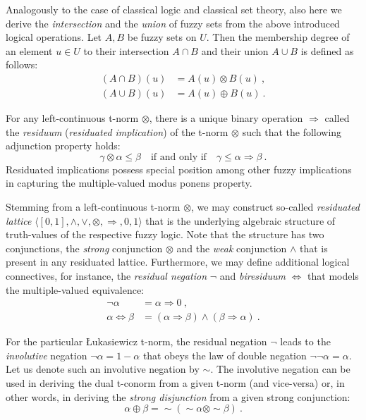 \documentclass[review]{elsarticle}
\begin{document}
Analogously to the case of classical logic and classical set theory, also here we derive the \emph{intersection} and the \emph{union} of fuzzy sets from the above introduced logical operations. Let $A, B$ be fuzzy sets on $U$. Then the membership degree of an element $u\in U$ to their intersection
$A \cap B$ and their union $A\cup B$ is defined as follows:
\begin{align*}
    (A\cap B)(u) &= A(u) \otimes B(u) \ , \\
    (A\cup B)(u) &= A(u) \oplus B(u) \ .
\end{align*}


For any left-continuous t-norm $\otimes$, there is a unique binary operation $\Rightarrow$
called the \emph{residuum} (\emph{residuated implication}) of the t-norm $\otimes$ such that the following adjunction property holds:
%
$$\gamma \otimes \alpha \le \beta\quad\textrm{if and only if}\quad \gamma \le \alpha \Rightarrow \beta \ . $$
%
Residuated implications possess special position among other fuzzy implications \citep{Baczynski_Jayaram_2008c} in capturing the multiple-valued modus ponens property. 

Stemming from a left-continuous t-norm $\otimes$, we may construct so-called \emph{residuated lattice} $\langle [0,1], \wedge, \vee, \otimes , \Rightarrow , 0 , 1 \rangle$ that is the underlying algebraic structure of truth-values of the respective fuzzy logic. Note that the structure has two conjunctions, the \emph{strong} conjunction $\otimes$ and the \emph{weak} conjunction $\wedge$ that is present in any residuated lattice. Furthermore, we may define additional logical connectives, for instance, the \emph{residual negation} $\lnot$
and \emph{biresiduum}  $\Leftrightarrow$ that models the multiple-valued equivalence:
%
\begin{align*}
\lnot\alpha &= \alpha \Rightarrow 0 \ , \\
\alpha \Leftrightarrow \beta &= (\alpha \Rightarrow \beta) \wedge (\beta \Rightarrow \alpha)\ .
\end{align*}

For the particular \L ukasiewicz t-norm, the residual negation $\lnot$ leads to the  \emph{involutive} negation $\neg \alpha = 1-\alpha$ that obeys the law of double negation $\lnot\lnot\alpha = \alpha$. Let us denote such an involutive negation by $\sim$. The involutive negation can be used in deriving the dual t-conorm from a given t-norm (and vice-versa) or, in other words, in deriving the \emph{strong disjunction} from a given strong conjunction:
$$\alpha\oplus\beta = {\sim}({\sim}\alpha \otimes {\sim}\beta)\ .$$
\end{document}
